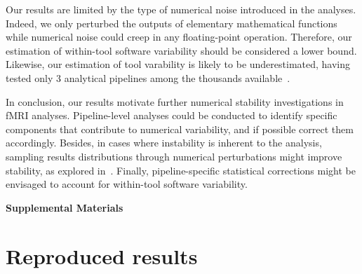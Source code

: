 \documentclass[11pt,onecolumn]{article}
\begin{document}
Our results are limited by the type of numerical noise introduced in the
analyses. Indeed, we only perturbed the outputs of elementary
mathematical functions while numerical noise could creep in any
floating-point operation. Therefore, our estimation of within-tool software variability should
be considered a lower bound. Likewise, our estimation of tool varability is
likely to be underestimated, having tested only 3 analytical pipelines
among the thousands available~\cite{carp2012plurality}.

In conclusion, our results motivate further numerical stability
investigations in fMRI analyses. Pipeline-level analyses could be conducted
to identify specific components that contribute to numerical variability,
and if possible correct them accordingly. Besides, in cases where
instability is inherent to the analysis, sampling results distributions
through numerical perturbations might improve stability, as explored
in~\cite{kiar2021data}. Finally, pipeline-specific statistical corrections
might be envisaged to account for within-tool software variability.




\clearpage

\setcounter{equation}{0}
\setcounter{figure}{0}
\setcounter{table}{0}
\setcounter{section}{0}

\makeatletter
\renewcommand{\theequation}{S\arabic{equation}}
\renewcommand{\thefigure}{S\arabic{figure}}
\renewcommand{\thesection}{S\arabic{section}}

\textbf{\centering \Large Supplemental Materials}

\section{Reproduced results}
\label{sec:supp-repro}
\end{document}
